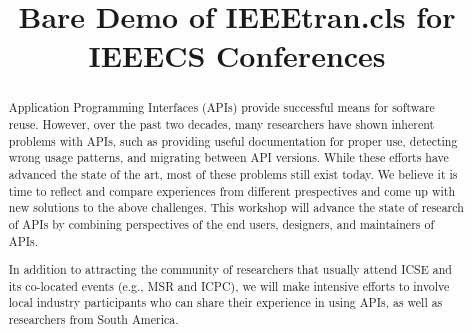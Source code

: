 \documentclass[10pt, conference]{IEEEtran}
\begin{document}
\title{Bare Demo of IEEEtran.cls for IEEECS Conferences}



\author{
\and
{}
}


\maketitle


\begin{abstract}
Application Programming Interfaces (APIs) provide successful means for software reuse. However, over the past two decades, many researchers have shown inherent problems with APIs, such as providing useful documentation for proper use, detecting wrong usage patterns, and migrating between API versions. While these efforts have advanced the state of the art, most of these problems still exist today. We believe it is time to reflect and compare experiences from different prespectives and come up with new solutions to the above challenges. This workshop will advance the state of research of APIs by combining perspectives of the end users, designers, and maintainers of APIs.

In addition to attracting the community of researchers that usually attend ICSE and its co-located events (e.g., MSR and ICPC), we will make intensive efforts to involve local industry participants who can share their experience in using APIs, as well as researchers from South America.
\end{abstract}
\end{document}
